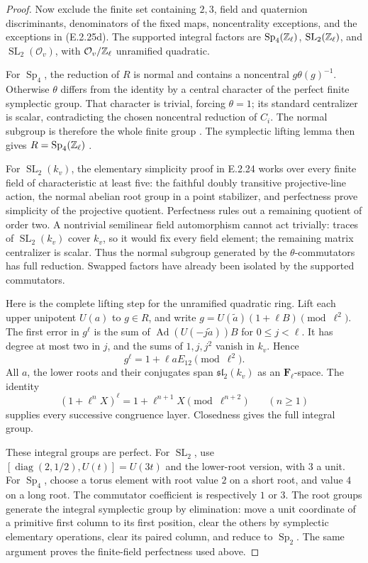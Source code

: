 \begin{proof}
Now exclude the finite set containing \(2,3\),
field and quaternion discriminants, denominators
of the fixed maps, noncentrality exceptions, and
the exceptions in (E.2.25d). The supported integral
factors are
\(\operatorname{Sp}_4(\mathbb Z_\ell)\),
\(\operatorname{SL}_2(\mathbb Z_\ell)\), and
\(\operatorname{SL}_2(\mathcal O_v)\), with
\(\mathcal O_v/\mathbb Z_\ell\) unramified quadratic.

For \(\operatorname{Sp}_4\), the reduction of
\(R\) is normal and contains a noncentral
\(g\theta(g)^{-1}\). Otherwise \(\theta\) differs
from the identity by a central character of the
perfect finite symplectic group. That character
is trivial, forcing \(\theta=1\); its standard
centralizer is scalar, contradicting the chosen
noncentral reduction of \(C_i\). The normal
subgroup is therefore the whole finite group
\cite[Lemma 2.3(4), p.~6]{GenMayleWang2024}.
The symplectic lifting lemma then gives
\(R=\operatorname{Sp}_4(\mathbb Z_\ell)\)
\cite[Lemma 2.4, p.~6]{GenLombardoSurfaces2015}.

For \(\operatorname{SL}_2(k_v)\), the elementary
simplicity proof in E.2.24 works over every finite
field of characteristic at least five: the faithful
doubly transitive projective-line action, the normal
abelian root group in a point stabilizer, and
perfectness prove simplicity of the projective
quotient. Perfectness rules out a remaining
quotient of order two. A nontrivial semilinear
field automorphism cannot act trivially: traces
of \(\operatorname{SL}_2(k_v)\) cover \(k_v\),
so it would fix every field element; the remaining
matrix centralizer is scalar. Thus the normal
subgroup generated by the \(\theta\)-commutators
has full reduction. Swapped factors have already
been isolated by the supported commutators.

Here is the complete lifting step for the unramified
quadratic ring. Lift each upper unipotent \(U(a)\)
to \(g\in R\), and write
\(g=U(\widetilde a)(1+\ell B)\pmod{\ell^2}\).
The first error in \(g^\ell\) is the sum of
\(\operatorname{Ad}(U(-j\widetilde a))B\) for
\(0\leq j<\ell\). It has degree at most two in
\(j\), and the sums of \(1,j,j^2\) vanish in
\(k_v\). Hence
\[
 g^\ell=1+\ell aE_{12}\pmod{\ell^2}.
\]
All \(a\), the lower roots and their conjugates
span \(\mathfrak{sl}_2(k_v)\) as an
\(\mathbf F_\ell\)-space. The identity
\[
 (1+\ell^nX)^\ell
       =1+\ell^{n+1}X\pmod{\ell^{n+2}}
            \qquad(n\geq1)
\]
supplies every successive congruence layer.
Closedness gives the full integral group.

These integral groups are perfect. For
\(\operatorname{SL}_2\), use
\([
\operatorname{diag}(2,1/2),U(t)]=U(3t)\)
and the lower-root version, with \(3\) a unit.
For \(\operatorname{Sp}_4\), choose a torus
element with root value \(2\) on a short root,
and value \(4\) on a long root. The commutator
coefficient is respectively \(1\) or \(3\).
The root groups generate the integral symplectic
group by elimination: move a unit coordinate of
a primitive first column to its first position,
clear the others by symplectic elementary operations,
clear its paired column, and reduce to
\(\operatorname{Sp}_2\). The same argument proves
the finite-field perfectness used above.


\end{proof}
